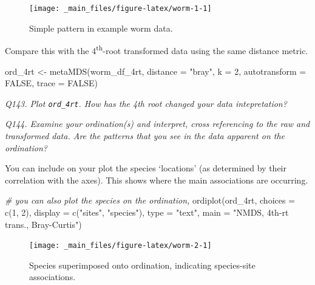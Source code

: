 \documentclass[
  11pt,
  a4paper,
]{book}
\newenvironment{Shaded}{\begin{snugshade}}{\end{snugshade}}
\newcommand{\AttributeTok}[1]{\textcolor[rgb]{0.77,0.63,0.00}{#1}}
\newcommand{\CommentTok}[1]{\textcolor[rgb]{0.56,0.35,0.01}{\textit{#1}}}
\newcommand{\ConstantTok}[1]{\textcolor[rgb]{0.00,0.00,0.00}{#1}}
\newcommand{\DecValTok}[1]{\textcolor[rgb]{0.00,0.00,0.81}{#1}}
\newcommand{\FunctionTok}[1]{\textcolor[rgb]{0.00,0.00,0.00}{#1}}
\newcommand{\NormalTok}[1]{#1}
\newcommand{\OtherTok}[1]{\textcolor[rgb]{0.56,0.35,0.01}{#1}}
\newcommand{\StringTok}[1]{\textcolor[rgb]{0.31,0.60,0.02}{#1}}
\begin{document}
\begin{figure}

{\centering \texttt{[image: \_main\_files/figure-latex/worm-1-1]} 

}

\caption{Simple pattern in example worm data.}\label{fig:worm-1}
\end{figure}

Compare this with the 4\textsuperscript{th}-root transformed data using the same distance metric.

\begin{Shaded}
\begin{Highlighting}[]
\NormalTok{ord\_4rt }\OtherTok{\textless{}{-}} \FunctionTok{metaMDS}\NormalTok{(worm\_df\_4rt, }\AttributeTok{distance =} \StringTok{"bray"}\NormalTok{, }\AttributeTok{k =} \DecValTok{2}\NormalTok{, }
                   \AttributeTok{autotransform =} \ConstantTok{FALSE}\NormalTok{, }\AttributeTok{trace =} \ConstantTok{FALSE}\NormalTok{)}
\end{Highlighting}
\end{Shaded}

\emph{Q143. Plot \texttt{ord\_4rt}. How has the 4th root changed your data intepretation?}

\emph{Q144. Examine your ordination(s) and interpret, cross referencing to the raw and transformed data. Are the patterns that you see in the data apparent on the ordination?}

You can include on your plot the species `locations' (as determined by their correlation with the axes). This shows where the main associations are occurring.

\begin{Shaded}
\begin{Highlighting}[]
\CommentTok{\# you can also plot the \textquotesingle{}species\textquotesingle{} on the ordination,}
\FunctionTok{ordiplot}\NormalTok{(ord\_4rt, }\AttributeTok{choices =} \FunctionTok{c}\NormalTok{(}\DecValTok{1}\NormalTok{, }\DecValTok{2}\NormalTok{), }\AttributeTok{display =} \FunctionTok{c}\NormalTok{(}\StringTok{"sites"}\NormalTok{, }\StringTok{"species"}\NormalTok{), }
         \AttributeTok{type =} \StringTok{"text"}\NormalTok{, }\AttributeTok{main =} \StringTok{"NMDS, 4th{-}rt trans., Bray{-}Curtis"}\NormalTok{)}
\end{Highlighting}
\end{Shaded}

\begin{figure}

{\centering \texttt{[image: \_main\_files/figure-latex/worm-2-1]} 

}

\caption{Species superimposed onto ordination, indicating species-site associations.}\label{fig:worm-2}
\end{figure}
\end{document}
